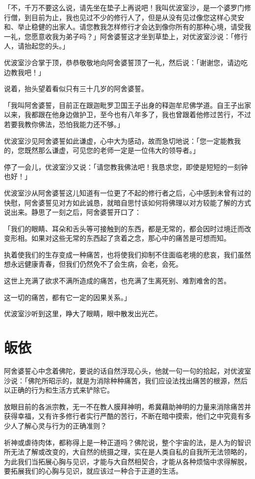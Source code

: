 \documentclass[12pt,twoside,openany]{book}
\begin{document}
「不，千万不要这么说，请先坐在垫子上再说吧！我叫优波室沙，是一个婆罗门修行僧，到目前为止，我也见过不少的修行人了，但是从没有见过像您这样心灵安和、举止稳健的出家人。请您教我怎样修行才会达到像你所有的那种心境，请受我一礼，您愿意收我为弟子吗？」阿舍婆誓这才坐到草垫上，对优波室沙说：「修行人，请抬起您的头。」

优波室沙合掌于顶，恭恭敬敬地向阿舍婆誓顶了一礼，然后说：「谢谢您，请边吃边教我吧！」

说着，抬头望着看似只有三十几岁的阿舍婆誓。

「我叫阿舍婆誓，目前正在跟迦毗罗卫国王子出身的释迦牟尼佛学道。自王子出家以来，我都跟在他身边做护卫，至今也有八年多了，我也曾跟着他修过苦行，不过若要我教你佛法，恐怕我能力还不够。」

优波室沙见阿舍婆誓如此谦虚，心中大为感动，故而急切地说：「您一定能教我的，您既然那么谦虚，可见您的老师一定是一位伟大的领导者。」

停了一会儿，优波室沙又说：「请您教我佛法吧！我恳求您，即使是短短的一刻钟也好！」

优波室沙从阿舍婆誓这儿知道有一位更了不起的修行者之后，心中感到未曾有过的快慰，阿舍婆誓见对方如此诚恳，就暗自思忖该如何将佛理以对方较能了解的方式说出来。静思了一刻之后，阿舍婆誓开口了：

「我们的眼睛、耳朵和舌头等可接触到的东西，都是无常的，都会因时过境迁而改变形相。如果对这些无常的东西起了贪着之念，那心中的痛苦是可想而知。

执着使我们的生存变成一种痛苦，也将使我们抑制不住面临老境的悲哀，我们虽然想永远健康青春，但我们仍然免不了会生病，会老，会死。

这世上充满了欲求不满所造成的痛苦，也充满了生离死别、难割难舍的苦。

这一切的痛苦，都有它一定的因果关系。」

优波室沙听到这里，睁大了眼睛，眼中散发出光芒。

\section{皈依}\label{sec3.15}

阿舍婆誓心中念着佛陀，要说的话自然浮现心头，他就一句一句的拾起，对优波室沙说：「佛陀所昭示的，就是为消除种种痛苦，我们应设法找出痛苦的根源，然后以正确的行为和生活方式来铲除它。

放眼目前的各派宗教，无一不在教人膜拜神明，希冀藉助神明的力量来消除痛苦并获得幸福，又有许多修行者实行严酷的苦行，不断在暗中摸索，他们之中究竟有多少人了解心灵与行为的正确准则？

祈神或虐待肉体，都称得上是一种正道吗？佛陀说，整个宇宙的法，是人为的智识所无法了解或改变的，大自然的统摄之理，实在是人类自私的自我所无法领略的，为此我们当拓展心胸与见识，才能与大自然相契合，才能从各种烦恼中求得解脱，要拓展我们的心胸与见识，就应该过一种合于正道的生活。
\end{document}
